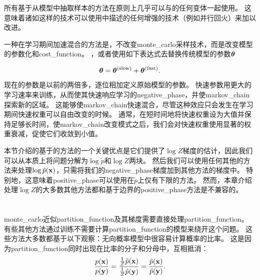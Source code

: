 所有基于从模型中抽取样本的方法在原则上几乎可以与的任何变体一起使用。
这意味着诸如这样的技术可以使用中描述的任何增强的技术（例如并行回火）来加以改进\citep{desjardins2010tempered,Cho10IJCNN-small}。


一种在学习期间加速混合的方法是，不改变\gls{monte_carlo}采样技术，而是改变模型的参数化和\gls{cost_function}。
，或者\citep{TielemanT2009-small}使用如下表达式去替换传统模型的参数$\boldsymbol{\theta}$

\begin{equation}
	\boldsymbol{\theta} = \boldsymbol{\theta}^{\text{(slow)}} + \boldsymbol{\theta}^{\text{(fast)}}.
\end{equation}
现在的参数是以前的两倍多，逐位相加定义原始模型的参数。
快速参数用更大的学习速率来训练，从而使其快速响应学习的\gls{negative_phase}，并使\gls{markov_chain}探索新的区域。
这能够使\gls{markov_chain}快速混合，尽管这种效应只会发生在学习期间快速权重可以自由改变的时候。
通常，在短时间地将快速权重设为大值并保持足够长时间，使\gls{markov_chain}改变模式之后，我们会对快速权重使用显著的权重衰减，促使它们收敛到小值。


本节介绍的基于的方法的一个关键优点是它们提供了$\log Z$梯度的估计，因此我们可以从本质上将问题分解为$\log \tilde{p}$和$\log Z$两块。
然后我们可以使用任何其他的方法来处理$\log \tilde{p}(\mathbf{x})$，只需将我们的\gls{negative_phase}梯度加到其他方法的梯度中。
特别地，这意味着\gls{positive_phase}可以使用在$\tilde{p}$上仅有下限的方法。
然而，本章介绍处理$\log Z$的大多数其他方法都和基于边界的\gls{positive_phase}方法是不兼容的。


\section{}
\label{sec:pseudolikelihood}
\gls{monte_carlo}近似\gls{partition_function}及其梯度需要直接处理\gls{partition_function}。
有些其他方法通过训练不需要计算\gls{partition_function}的模型来绕开这个问题。
这些方法大多数都基于以下观察：无向概率模型中很容易计算概率的比率。
这是因为\gls{partition_function}同时出现在比率的分子和分母中，互相抵消：
\begin{equation}
	\frac{p(\mathbf{x})}{ p(\mathbf{y}) } = \frac{ \frac{1}{Z} \tilde{p}(\mathbf{x}) }{ \frac{1}{Z} \tilde{p}(\mathbf{y}) } =
\frac{ \tilde{p}(\mathbf{x}) }{ \tilde{p}(\mathbf{y}) }.
\end{equation}


